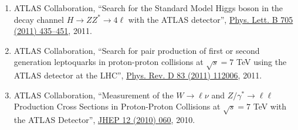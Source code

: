 \begin{enumerate}
\item ATLAS Collaboration, ``Search for the Standard Model Higgs boson in the decay channel $H\to ZZ^{*}\to4\ell$ with the ATLAS detector'', \href{https://doi.org/10.1016/j.physletb.2011.10.034}{Phys. Lett. B 705 (2011) 435--451}, 2011.
\item ATLAS Collaboration, ``Search for pair production of first or second generation leptoquarks in proton-proton collisions at $\sqrt{s}=7$ TeV using the ATLAS detector at the LHC'', \href{https://doi.org/10.1103/PhysRevD.83.112006}{Phys. Rev. D 83 (2011) 112006}, 2011.
\item ATLAS Collaboration, ``Measurement of the $W \to \ell\nu$ and $Z/\gamma^* \to \ell\ell$ Production Cross Sections in Proton-Proton Collisions at $\sqrt{s} = 7$ TeV with the ATLAS Detector'', \href{https://doi.org/10.1007/JHEP12(2010)060}{JHEP 12 (2010) 060}, 2010.
\end{enumerate}

